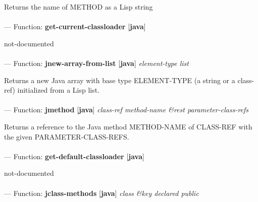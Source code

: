 \begin{adjustwidth}{5em}{5em}
Returns the name of METHOD as a Lisp string
\end{adjustwidth}

\paragraph{}
\label{JAVA:GET-CURRENT-CLASSLOADER}
--- Function: \textbf{get-current-classloader} [\textbf{java}] \textit{}

\begin{adjustwidth}{5em}{5em}
not-documented
\end{adjustwidth}

\paragraph{}
\label{JAVA:JNEW-ARRAY-FROM-LIST}
--- Function: \textbf{jnew-array-from-list} [\textbf{java}] \textit{element-type list}

\begin{adjustwidth}{5em}{5em}
Returns a new Java array with base type ELEMENT-TYPE (a string or a class-ref)
   initialized from a Lisp list.
\end{adjustwidth}

\paragraph{}
\label{JAVA:JMETHOD}
--- Function: \textbf{jmethod} [\textbf{java}] \textit{class-ref method-name \&rest parameter-class-refs}

\begin{adjustwidth}{5em}{5em}
Returns a reference to the Java method METHOD-NAME of CLASS-REF with the given PARAMETER-CLASS-REFS.
\end{adjustwidth}

\paragraph{}
\label{JAVA:GET-DEFAULT-CLASSLOADER}
--- Function: \textbf{get-default-classloader} [\textbf{java}] \textit{}

\begin{adjustwidth}{5em}{5em}
not-documented
\end{adjustwidth}

\paragraph{}
\label{JAVA:JCLASS-METHODS}
--- Function: \textbf{jclass-methods} [\textbf{java}] \textit{class \&key declared public}

